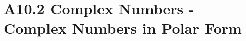 \chapter{A10.2 Complex Numbers - Complex Numbers in Polar Form}\label{chap:A10.2}


\clearpage

\clearpage
